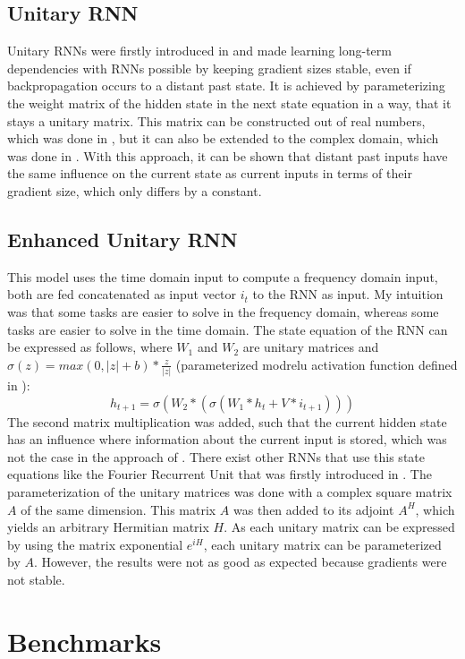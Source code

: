 \documentclass[draft,final]{vutinfth} %
\begin{document}
\subsection{Unitary RNN} \label{Unitary RNN}
Unitary RNNs were firstly introduced in \cite{UnitaryRNNs} and made learning long-term dependencies with RNNs possible by keeping gradient sizes stable, even if backpropagation occurs to a distant past state. 
It is achieved by parameterizing the weight matrix of the hidden state in the next state equation in a way, that it stays a unitary matrix. 
This matrix can be constructed out of real numbers, which was done in \cite{UnitaryRNNs}, but it can also be extended to the complex domain, which was done in \cite{EfficientUnitaryRNNs}.
With this approach, it can be shown that distant past inputs have the same influence on the current state as current inputs in terms of their gradient size, which only differs by a constant.
\subsection{Enhanced Unitary RNN} \label{Enhanced Unitary RNN}
This model uses the time domain input to compute a frequency domain input, both are fed concatenated as input vector $i_t$ to the RNN as input.
My intuition was that some tasks are easier to solve in the frequency domain, whereas some tasks are easier to solve in the time domain.
The state equation of the RNN can be expressed as follows, where $W_1$ and $W_2$ are unitary matrices and $\sigma(z) = max(0,|z|+b)*\frac{z}{|z|}$ (parameterized modrelu activation function defined in \cite{UnitaryRNNs}):
\begin{equation}
h_{t+1} = \sigma(W_2 * (\sigma(W_1 * h_t + V * i_{t+1})))
\end{equation}
The second matrix multiplication was added, such that the current hidden state has an influence where information about the current input is stored, which was not the case in the approach of \cite{UnitaryRNNs}.
There exist other RNNs that use this state equations like the Fourier Recurrent Unit that was firstly introduced in \cite{FRU}.
The parameterization of the unitary matrices was done with a complex square matrix $A$ of the same dimension.
This matrix $A$ was then added to its adjoint $A^H$, which yields an arbitrary Hermitian matrix $H$. 
As each unitary matrix can be expressed by using the matrix exponential $e^{iH}$, each unitary matrix can be parameterized by $A$.
However, the results were not as good as expected because gradients were not stable.
\section{Benchmarks}
\end{document}

